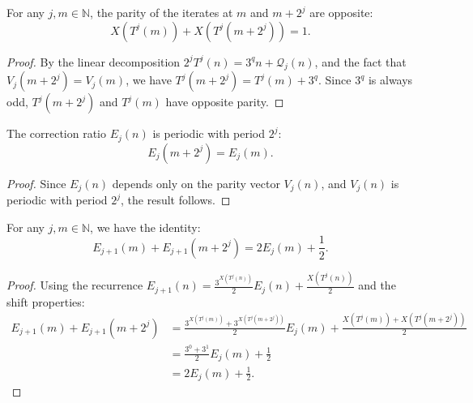 \begin{lemma}\label{lemma:X_T_iter_shift}\leanok
For any $j, m \in \mathbb{N}$, the parity of the iterates at $m$ and $m + 2^j$ are opposite:
\begin{equation}
    X(T^j(m)) + X(T^j(m + 2^j)) = 1.
\end{equation}
\end{lemma}
\begin{proof}\leanok
By the linear decomposition $2^j T^j(n) = 3^{q} n + \mathcal{Q}_j(n)$, and the fact that $V_j(m + 2^j) = V_j(m)$, we have $T^j(m + 2^j) = T^j(m) + 3^q$. Since $3^q$ is always odd, $T^j(m + 2^j)$ and $T^j(m)$ have opposite parity.
\end{proof}

\begin{lemma}\label{lemma:E_shift}\leanok
The correction ratio $E_j(n)$ is periodic with period $2^j$:
\begin{equation}
    E_j(m + 2^j) = E_j(m).
\end{equation}
\end{lemma}
\begin{proof}\leanok
Since $E_j(n)$ depends only on the parity vector $V_j(n)$, and $V_j(n)$ is periodic with period $2^j$, the result follows.
\end{proof}

\begin{lemma}\label{lemma:E_succ_pair_sum}\leanok
For any $j, m \in \mathbb{N}$, we have the identity:
\begin{equation}
    E_{j+1}(m) + E_{j+1}(m + 2^j) = 2 E_j(m) + \frac{1}{2}.
\end{equation}
\end{lemma}
\begin{proof}\leanok
Using the recurrence $E_{j+1}(n) = \frac{3^{X(T^j(n))}}{2} E_j(n) + \frac{X(T^j(n))}{2}$ and the shift properties:
\begin{align*}
    E_{j+1}(m) + E_{j+1}(m + 2^j) &= \frac{3^{X(T^j(m))} + 3^{X(T^j(m + 2^j))}}{2} E_j(m) + \frac{X(T^j(m)) + X(T^j(m + 2^j))}{2} \\
    &= \frac{3^0 + 3^1}{2} E_j(m) + \frac{1}{2} \\
    &= 2 E_j(m) + \frac{1}{2}.
\end{align*}
\end{proof}

